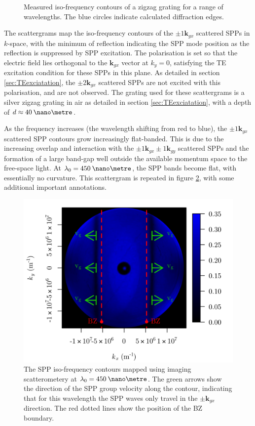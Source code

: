 \begin{figure}
	\caption[Measured iso-frequency contours of a zigzag grating for a range of wavelengths. ]{Measured iso-frequency contours of a zigzag grating for a range of wavelengths. The blue circles indicate calculated diffraction edges.\label{fig:anistropic-zigzag-scattergrams}}
\end{figure}

The scattergrams map the iso-frequency contours of the $\pm 1\mathbf{k}_{gx}$ scattered SPPs in $k$-space, with the minimum of reflection indicating the SPP mode position as the reflection is suppressed by SPP excitation. The polarisation is set so that the electric field lies orthogonal to the $\mathbf{k}_{gx}$ vector at $k_y=0$, satisfying the TE excitation condition for these SPPs in this plane. As detailed in section \ref{sec:TEexciatation}, the $\pm 2\mathbf{k}_{gx}$ scattered SPPs are not excited with this polarisation, and are not observed. The grating used for these scattergrams is a silver zigzag grating in air as detailed in section \ref{sec:TEexciatation}, with a depth of $d\approx 40 \:\nano\metre$. 

As the frequency increases (the wavelength shifting from red to blue), the $\pm 1\mathbf{k}_{gx}$ scattered SPP contours grow increasingly flat-banded. This is due to the increasing overlap and interaction with the $\pm 1\mathbf{k}_{gx}\pm 1\mathbf{k}_{gy}$ scattered SPPs and the formation of a large band-gap well outside the available momentum space to the free-space light. At $\lambda_0=450\:\nano\metre$, the SPP bands become flat, with essentially no curvature. This scattergram is repeated in figure \ref{fig:450scatter}, with some additional important annotations.

\begin{figure}
\begin{center}
\includegraphics[width=0.6\linewidth]{scattergrams/figure-450nm-collimatedSPPs.png}
\end{center}
\caption[The SPP iso-frequency contours mapped using imaging scatterometery at $\lambda_0=450\:\nano\metre$.]{The SPP iso-frequency contours mapped using imaging scatterometery at $\lambda_0=450\:\nano\metre$. The green arrows show the direction of the SPP group velocity along the contour, indicating that for this wavelength the SPP waves only travel in the $\pm\mathbf{k}_{gx}$ direction. The red dotted lines show the position of the BZ boundary.\label{fig:450scatter}}
\end{figure}

